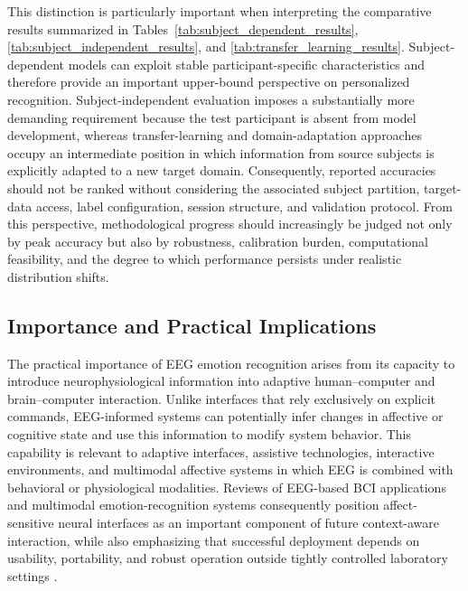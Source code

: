 \documentclass{WileyMSP-template}
\begin{document}
This distinction is particularly important when interpreting the comparative results summarized in Tables~\ref{tab:subject_dependent_results}, \ref{tab:subject_independent_results}, and \ref{tab:transfer_learning_results}. Subject-dependent models can exploit stable participant-specific characteristics and therefore provide an important upper-bound perspective on personalized recognition. Subject-independent evaluation imposes a substantially more demanding requirement because the test participant is absent from model development, whereas transfer-learning and domain-adaptation approaches occupy an intermediate position in which information from source subjects is explicitly adapted to a new target domain. Consequently, reported accuracies should not be ranked without considering the associated subject partition, target-data access, label configuration, session structure, and validation protocol. From this perspective, methodological progress should increasingly be judged not only by peak accuracy but also by robustness, calibration burden, computational feasibility, and the degree to which performance persists under realistic distribution shifts.

\subsection{Importance and Practical Implications}
\label{subsec:importance_practical_implications}

The practical importance of EEG emotion recognition arises from its capacity to introduce neurophysiological information into adaptive human--computer and brain--computer interaction. Unlike interfaces that rely exclusively on explicit commands, EEG-informed systems can potentially infer changes in affective or cognitive state and use this information to modify system behavior. This capability is relevant to adaptive interfaces, assistive technologies, interactive environments, and multimodal affective systems in which EEG is combined with behavioral or physiological modalities. Reviews of EEG-based BCI applications and multimodal emotion-recognition systems consequently position affect-sensitive neural interfaces as an important component of future context-aware interaction, while also emphasizing that successful deployment depends on usability, portability, and robust operation outside tightly controlled laboratory settings \cite{varbu2022bciapplications,moin2023multimodalhci}.
\end{document}
